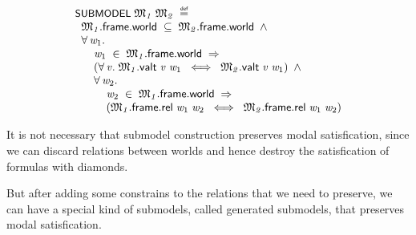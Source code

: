 \documentclass[letterpaper]{article}
\renewcommand{\HOLConst}[1]{{\textsf{\upshape\small #1}}}
\newenvironment{holmath}{\begin{displaymath}\begin{array}{l}}{\end{array}\end{displaymath}\ignorespacesafterend}
\begin{document}
\begin{holmath}
  \HOLConst{SUBMODEL}\;\HOLFreeVar{\ensuremath{\mathfrak{M}\sb{1}}}\;\HOLFreeVar{\ensuremath{\mathfrak{M}\sb{2}}}\;\HOLSymConst{\HOLTokenDefEquality{}}\\
\;\;\HOLFreeVar{\ensuremath{\mathfrak{M}\sb{1}}}.\HOLFieldName{frame}.\HOLFieldName{world}\;\HOLSymConst{\HOLTokenSubset{}}\;\HOLFreeVar{\ensuremath{\mathfrak{M}\sb{2}}}.\HOLFieldName{frame}.\HOLFieldName{world}\;\HOLSymConst{\HOLTokenConj{}}\\
\;\;\HOLSymConst{\HOLTokenForall{}}\HOLBoundVar{w\sb{\mathrm{1}}}.\\
\;\;\;\;\;\;\HOLBoundVar{w\sb{\mathrm{1}}}\;\HOLSymConst{\HOLTokenIn{}}\;\HOLFreeVar{\ensuremath{\mathfrak{M}\sb{1}}}.\HOLFieldName{frame}.\HOLFieldName{world}\;\HOLSymConst{\HOLTokenImp{}}\\
\;\;\;\;\;\;(\HOLSymConst{\HOLTokenForall{}}\HOLBoundVar{v}.\;\HOLFreeVar{\ensuremath{\mathfrak{M}\sb{1}}}.\HOLFieldName{valt}\;\HOLBoundVar{v}\;\HOLBoundVar{w\sb{\mathrm{1}}}\;\HOLSymConst{\HOLTokenEquiv{}}\;\HOLFreeVar{\ensuremath{\mathfrak{M}\sb{2}}}.\HOLFieldName{valt}\;\HOLBoundVar{v}\;\HOLBoundVar{w\sb{\mathrm{1}}})\;\HOLSymConst{\HOLTokenConj{}}\\
\;\;\;\;\;\;\HOLSymConst{\HOLTokenForall{}}\HOLBoundVar{w\sb{\mathrm{2}}}.\\
\;\;\;\;\;\;\;\;\;\;\HOLBoundVar{w\sb{\mathrm{2}}}\;\HOLSymConst{\HOLTokenIn{}}\;\HOLFreeVar{\ensuremath{\mathfrak{M}\sb{1}}}.\HOLFieldName{frame}.\HOLFieldName{world}\;\HOLSymConst{\HOLTokenImp{}}\\
\;\;\;\;\;\;\;\;\;\;(\HOLFreeVar{\ensuremath{\mathfrak{M}\sb{1}}}.\HOLFieldName{frame}.\HOLFieldName{rel}\;\HOLBoundVar{w\sb{\mathrm{1}}}\;\HOLBoundVar{w\sb{\mathrm{2}}}\;\HOLSymConst{\HOLTokenEquiv{}}\;\HOLFreeVar{\ensuremath{\mathfrak{M}\sb{2}}}.\HOLFieldName{frame}.\HOLFieldName{rel}\;\HOLBoundVar{w\sb{\mathrm{1}}}\;\HOLBoundVar{w\sb{\mathrm{2}}})
\end{holmath}

It is not necessary that submodel construction preserves modal satisfication, since we can discard relations between worlds and hence destroy the satisfication of formulas with diamonds. 



But after adding some constrains to the relations that we need to preserve, we can have a special kind of submodels, called generated submodels, that preserves modal satisfication.
\end{document}
